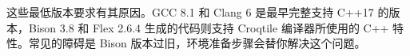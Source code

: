 这些最低版本要求有其原因。GCC 8.1 和 Clang 6 是最早完整支持 C++17 的版本，Bison 3.8 和 Flex 2.6.4 生成的代码则支持 Croqtile 编译器所使用的 C++ 特性。常见的障碍是 Bison 版本过旧，环境准备步骤会替你解决这个问题。
